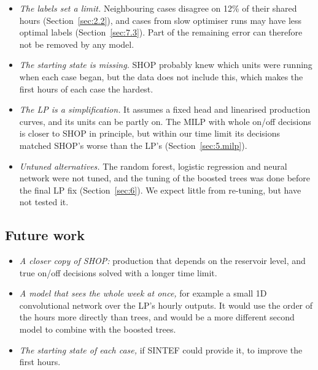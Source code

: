 \begin{itemize}
  \item \emph{The labels set a limit.} Neighbouring cases disagree on 12\% of their shared hours (Section~\ref{sec:2.2}), and cases from slow optimiser runs may have less optimal labels (Section~\ref{sec:7.3}). Part of the remaining error can therefore not be removed by any model.
  \item \emph{The starting state is missing.} SHOP probably knew which units were running when each case began, but the data does not include this, which makes the first hours of each case the hardest.
  \item \emph{The LP is a simplification.} It assumes a fixed head and linearised production curves, and its units can be partly on. The MILP with whole on/off decisions is closer to SHOP in principle, but within our time limit its decisions matched SHOP's worse than the LP's (Section~\ref{sec:5.milp}).
  \item \emph{Untuned alternatives.} The random forest, logistic regression and neural network were not tuned, and the tuning of the boosted trees was done before the final LP fix (Section~\ref{sec:6}). We expect little from re-tuning, but have not tested it.
\end{itemize}

\subsection{Future work}\label{sec:9.future}

\begin{itemize}
  \item \emph{A closer copy of SHOP:} production that depends on the reservoir level, and true on/off decisions solved with a longer time limit.
  \item \emph{A model that sees the whole week at once,} for example a small 1D convolutional network over the LP's hourly outputs. It would use the order of the hours more directly than trees, and would be a more different second model to combine with the boosted trees.
  \item \emph{The starting state of each case,} if SINTEF could provide it, to improve the first hours.
\end{itemize}
